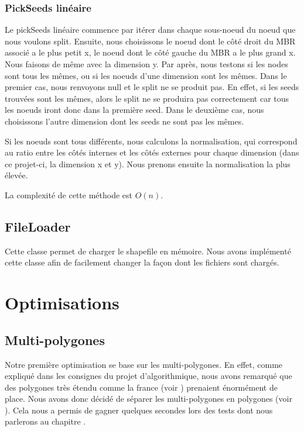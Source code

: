 \documentclass[utf8]{article}
\begin{document}
\begin{large}
    \subsubsection{PickSeeds linéaire}\label{PickSeeds lineaire}
    \indent
    \par
    Le pickSeeds linéaire commence par itérer dans chaque sous-noeud du noeud
    que nous voulons split. Ensuite, nous choisissons le noeud dont le côté droit du MBR
    associé a le plus petit x, le noeud dont le côté gauche du MBR a le plus grand
    x. Nous faisons de même avec la dimension y. Par après, nous testons si les
    nodes sont tous les mêmes, ou si les noeuds d'une dimension sont les mêmes.
    Dans le premier cas, nous renvoyons null et le split ne se produit pas. En
    effet, si les seeds trouvées sont les mêmes, alors le split ne se produira pas
    correctement car tous les noeuds iront donc dans la première seed. Dans le
    deuxième cas, nous choisissons l'autre dimension dont les seeds ne sont pas
    les mêmes.
    \par
    \indent
    \par
    Si les noeuds sont tous différents, nous calculons la normalisation, qui
    correspond au ratio entre les côtés internes et les côtés externes pour chaque
    dimension (dans ce projet-ci, la dimension x et y). Nous prenons ensuite la
    normalisation la plus élevée.
    \par
    \par
    \indent
    La complexité de cette méthode est $O(n)$.
    \par

    \subsection{FileLoader}
    \indent
    \par
    Cette classe permet de charger le shapefile en mémoire. Nous avons implémenté
    cette classe afin de facilement changer la façon dont les fichiers sont chargés.


    \section{Optimisations}
    \subsection{Multi-polygones}
    \indent
    \par
    Notre première optimisation se base sur les multi-polygones. En effet, comme
    expliqué dans les consignes du projet d'algorithmique, nous avons remarqué que
    des polygones très étendu comme la france (voir )
    prenaient énormément de place. Nous avons donc décidé de séparer les
    multi-polygones en polygones (voir ). Cela nous a
    permis de gagner quelques secondes lors des tests dont nous parlerons au
    chapitre .


\end{large}
\end{document}
